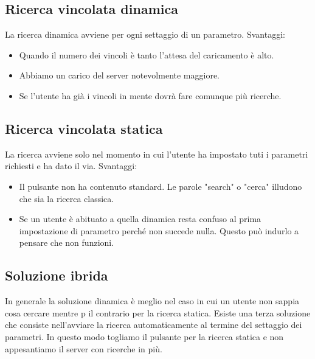 					
		\subsection{Ricerca vincolata dinamica}
			La ricerca dinamica avviene per ogni settaggio di un parametro.
			Svantaggi:
			\begin{itemize}
				\item Quando il numero dei vincoli è tanto l'attesa del caricamento è alto.
				\item Abbiamo un carico del server notevolmente maggiore.
				\item Se l'utente ha già i vincoli in mente dovrà fare comunque più ricerche.
			\end{itemize}
	
		\subsection{Ricerca vincolata statica}
			La ricerca avviene solo nel momento in cui l'utente ha impostato tuti i parametri richiesti e ha dato il via.
			Svantaggi:
			\begin{itemize}
				\item Il pulsante non ha contenuto standard. Le parole "search" o "cerca" illudono che sia la ricerca classica. 
				\item Se un utente è abituato a quella dinamica resta confuso al prima impostazione di parametro perché non succede nulla. Questo può indurlo a pensare che non funzioni.
			\end{itemize}
		
		\subsection{Soluzione ibrida}
			In generale la soluzione dinamica è meglio nel caso in cui un utente non sappia cosa cercare mentre p il contrario per la ricerca statica. Esiste una terza soluzione che consiste nell'avviare la ricerca automaticamente al termine del settaggio dei parametri. In questo modo togliamo il pulsante per la ricerca statica e non appesantiamo il server con ricerche in più.
		
